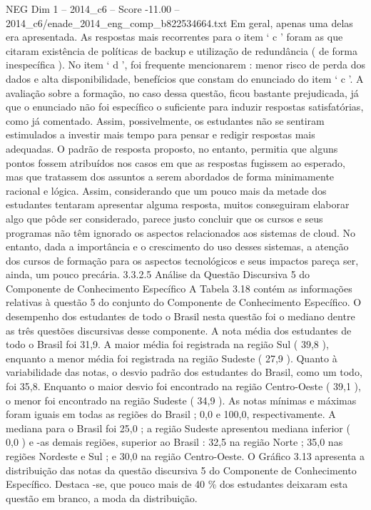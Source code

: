 \begin{textsample}{NEG Dim 1 – 2014\_c6 – Score -11.00 – 2014\_c6/enade\_2014\_eng\_comp\_b822534664.txt}
Em geral, apenas uma delas era apresentada.
As respostas mais recorrentes para o item ‘ c ’ foram as que citaram existência de políticas de backup e utilização de redundância ( de forma inespecífica ).
No item ‘ d ’, foi frequente mencionarem : menor risco de perda dos dados e alta disponibilidade, benefícios que constam do enunciado do item ‘ c ’.
A avaliação sobre a formação, no caso dessa questão, ficou bastante prejudicada, já que o enunciado não foi específico o suficiente para induzir respostas satisfatórias, como já comentado.
Assim, possivelmente, os estudantes não se sentiram estimulados a investir mais tempo para pensar e redigir respostas mais adequadas.
O padrão de resposta proposto, no entanto, permitia que alguns pontos fossem atribuídos nos casos em que as respostas fugissem ao esperado, mas que tratassem dos assuntos a serem abordados de forma minimamente racional e lógica.
Assim, considerando que um pouco mais da metade dos estudantes tentaram apresentar alguma resposta, muitos conseguiram elaborar algo que pôde ser considerado, parece justo concluir que os cursos e seus programas não têm ignorado os aspectos relacionados aos sistemas de cloud.
No entanto, dada a importância e o crescimento do uso desses sistemas, a atenção dos cursos de formação para os aspectos tecnológicos e seus impactos pareça ser, ainda, um pouco precária. 3.3.2.5 Análise da Questão Discursiva 5 do Componente de Conhecimento Específico A Tabela 3.18 contém as informações relativas à questão 5 do conjunto do Componente de Conhecimento Específico.
O desempenho dos estudantes de todo o Brasil nesta questão foi o mediano dentre as três questões discursivas desse componente.
A nota média dos estudantes de todo o Brasil foi 31,9.
A maior média foi registrada na região Sul ( 39,8 ), enquanto a menor média foi registrada na região Sudeste ( 27,9 ).
Quanto à variabilidade das notas, o desvio padrão dos estudantes do Brasil, como um todo, foi 35,8.
Enquanto o maior desvio foi encontrado na região Centro-Oeste ( 39,1 ), o menor foi encontrado na região Sudeste ( 34,9 ).
As notas mínimas e máximas foram iguais em todas as regiões do Brasil ; 0,0 e 100,0, respectivamente.
A mediana para o Brasil foi 25,0 ; a região Sudeste apresentou mediana inferior ( 0,0 ) e -as demais regiões, superior ao Brasil : 32,5 na região Norte ; 35,0 nas regiões Nordeste e Sul ; e 30,0 na região Centro-Oeste.
O Gráfico 3.13 apresenta a distribuição das notas da questão discursiva 5 do Componente de Conhecimento Específico.
Destaca -se, que pouco mais de 40 \% dos estudantes deixaram esta questão em branco, a moda da distribuição.

\end{textsample}
